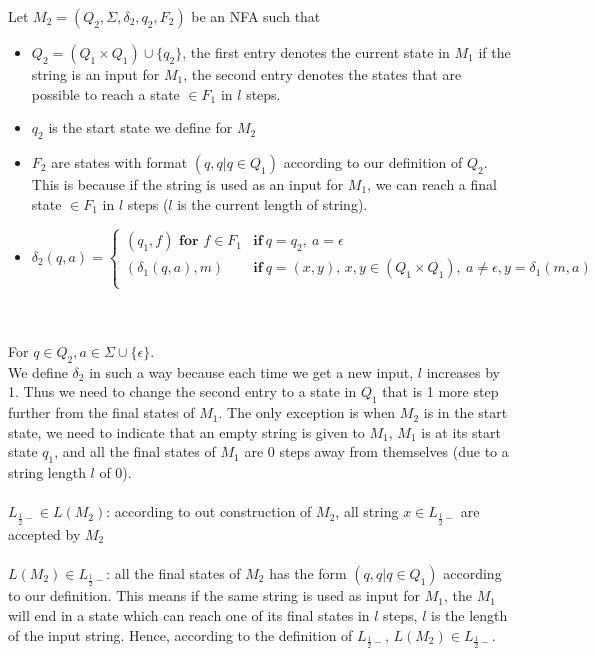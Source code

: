 \documentclass[12pt]{article}
\theoremstyle{definition}
\numberwithin{equation}{section}
\begin{document}
Let $M_2=(Q_2, \Sigma, \delta_2, q_2, F_2)$ be an NFA such that\\
\begin{itemize}
	\item $Q_2 = (Q_1\times Q_1)\cup \{q_2\}$, the first entry denotes the current state in $M_1$ if the string is an input for $M_1$, the second entry denotes the states that are possible to reach a state $\in F_1$ in $l$ steps.\\
	\item $q_2$ is the start state we define for $M_2$\\
	\item $F_2$ are states with format $(q,q|q\in Q_1)$ according to our definition of $Q_2$. This is because if the string is used as an input for $M_1$, we can reach a final state $\in F_1$ in $l$ steps ($l$ is the current length of string).
	\item $\delta_2(q, a)=
    \begin{cases}
               (q_1, f) \textbf{ for }f \in F_1 &\textbf{if}\ q = q_2,\ a = \epsilon\\
               (\delta_1(q,a),m) &\textbf{if}\ q = (x,y)\textbf{, } x,y \in (Q_1\times Q_1),\ a \neq \epsilon,y=\delta_1(m,a)\\
    \end{cases}$\\~\\~\\
\end{itemize}    
For $q \in Q_2, a \in \Sigma \cup \{\epsilon\}.$\\
We define $\delta_2$ in such a way because each time we get a new input, $l$  increases by 1. Thus we need to change the second entry to a state in $Q_1$ that is 1 more step further from the final states of $M_1$. The only exception is when $M_2$ is in the start state, we need to indicate that an empty string is given to $M_1$, $M_1$ is at its start state $q_1$, and all the final states of $M_1$ are 0 steps away from themselves (due to a string length $l$ of 0). \\~\\

$L_{\frac{1}{2}-} \in L(M_2)$: according to out construction of $M_2$, all string $x \in L_{\frac{1}{2}-}$ are accepted by $M_2$ \\~\\
$L(M_2) \in L_{\frac{1}{2}-}$: all the final states of $M_2$ has the form $(q,q|q\in Q_1)$ according to our definition. This means if the same string is used as input for $M_1$, the $M_1$ will end in a state which can reach one of its final states in $l$ steps, $l$ is the length of the input string. Hence, according to the definition of $L_{\frac{1}{2}-}$, $L(M_2) \in L_{\frac{1}{2}-}$. \\~\\
\end{document}
